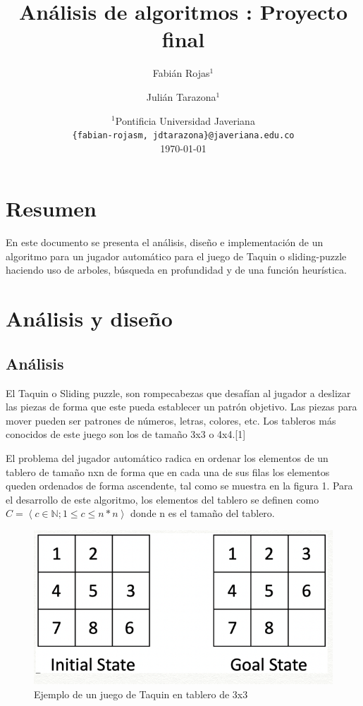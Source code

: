 \documentclass[a4paper]{article}
\title{Análisis de algoritmos : Proyecto final}
\author{Fabián Rojas$^1$ \and Julián Tarazona$^1$}
\date{
	$^1$Pontificia Universidad Javeriana \\ \texttt{\{fabian-rojasm, jdtarazona\}@javeriana.edu.co}\\%
	\today
}
\theoremstyle{plain}
\theoremstyle{definition}
\begin{document}
\maketitle
    \section{Resumen}
	    \label{sec:def}
	    \hspace{1mm}
	    En este documento se presenta el análisis, diseño e implementación de un algoritmo para un jugador automático para el juego de Taquin o sliding-puzzle haciendo uso de arboles, búsqueda en profundidad y de una función heurística.
	    
	\section{Análisis y diseño}
	    \label{sec:def}
	    \subsection{Análisis}
	    
	    El Taquin o Sliding puzzle, son rompecabezas que desafían al jugador a deslizar las piezas de forma que este pueda establecer un patrón objetivo. Las piezas para mover pueden ser patrones de números, letras, colores, etc. Los tableros más conocidos de este juego son los de tamaño 3x3 o 4x4.[1]\newline
	    
	    El problema del jugador automático radica en ordenar los elementos de un tablero de tamaño nxn de forma que en cada una de sus filas los elementos queden ordenados de forma ascendente, tal como se muestra en la figura 1. Para el desarrollo de este algoritmo, los elementos del tablero se definen como $C =\left\langle c \in \mathbb{N};1 \le c \le n*n \right\rangle$ donde n es el tamaño del tablero.
	    
	    \begin{figure}[h]
        
        \centering
        \includegraphics[scale=0.4]{phpPup4AX.png}
        \caption{Ejemplo de un juego de Taquin en tablero de 3x3}
        \end{figure}
	    
\end{document}
